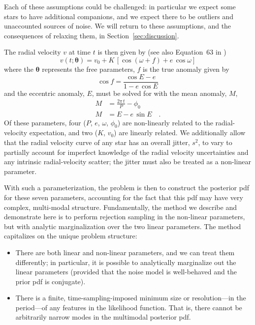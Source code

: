 \documentclass[manuscript, letterpaper]{aastex6}
\newcommand{\sectionname}{Section}
\newcommand{\eqname}{Equation}
\newcommand{\bs}[1]{\boldsymbol{#1}}
\begin{document}
Each of these assumptions could be challenged: in particular we expect some stars
to have additional companions, and we expect there to be outliers and
unaccounted sources of noise.
We will return to these assumptions, and the consequences of relaxing them, in
\sectionname~\ref{sec:discussion}.

The radial velocity $v$ at time $t$ is then given by (see also \eqname~63 in
\citealt{Murray:2010})
\begin{equation}
  v(t;\bs{\theta}) = v_0 + K\,[\cos(\omega + f) + e\,\cos\omega]
\end{equation}
where the $\bs{\theta}$ represents the free parameters, $f$ is the true anomaly
given by
\begin{equation}
  \cos f = \frac{\cos E - e}{1 - e\, \cos E}
\end{equation}
and the eccentric anomaly, $E$, must be solved for with the mean
anomaly, $M$,
\begin{align}
  M &= \frac{2\pi\, t}{P} - \phi_0\\
  M &= E - e\,\sin E \quad .
\end{align}
Of these parameters, four ($P$, $e$, $\omega$, $\phi_0$) are non-linearly
related to the radial-velocity expectation, and two ($K$, $v_0$) are
linearly related.
We additionally allow that the radial velocity curve of any star has an overall
jitter, $s^2$, to vary to partially account for
imperfect knowledge of the radial velocity uncertainties and any intrinsic
radial-velocity scatter; the jitter must also be treated as a non-linear
parameter.

With such a parameterization, the problem is then to construct the posterior pdf
for these seven parameters, accounting for the fact that this pdf
may have very complex, multi-modal structure.
Fundamentally, the method we describe and demonstrate here is to perform
rejection sampling in the non-linear parameters, but with analytic
marginalization over the two linear parameters.
The method capitalizes on the unique problem structure:
\begin{itemize}\itemsep0ex
\item There are both linear and non-linear parameters, and we can
  treat them differently; in particular, it is possible to
  analytically marginalize out the linear parameters (provided that the
  noise model is well-behaved and the prior pdf is conjugate).
\item There is a finite, time-sampling-imposed minimum size or
  resolution---in the period---of any features in the
  likelihood function. That is, there cannot be arbitrarily narrow
  modes in the multimodal posterior pdf.
\end{itemize}
\end{document}
